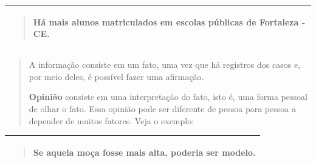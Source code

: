 \begin{longtable}[]{@{}l@{}}
\toprule
\begin{minipage}[t]{0.97\columnwidth}\raggedright\strut
\begin{quote}
Há mais alunos matriculados em escolas públicas de Fortaleza - CE.
\end{quote}\strut
\end{minipage}\tabularnewline
\bottomrule
\end{longtable}

\begin{quote}
A informação consiste em um fato, uma vez que há registros dos casos e,
por meio deles, é possível fazer uma afirmação.

\textbf{Opinião} consiste em uma interpretação do fato, isto é, uma
forma pessoal de olhar o fato. Essa opinião pode ser diferente de pessoa
para pessoa a depender de muitos fatores. Veja o exemplo:
\end{quote}

\begin{longtable}[]{@{}l@{}}
\toprule
\begin{minipage}[t]{0.97\columnwidth}\raggedright\strut
\begin{quote}
Se aquela moça fosse mais alta, poderia ser modelo.
\end{quote}\strut
\end{minipage}\tabularnewline
\bottomrule
\end{longtable}

